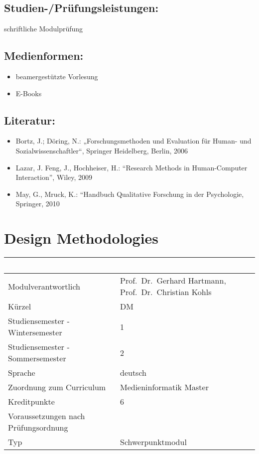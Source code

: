 \section*{Studien-/Prüfungsleistungen:}\label{studien-pruxfcfungsleistungen-9}

schriftliche Modulprüfung

\section*{Medienformen:}\label{medienformen-9}

\begin{itemize}
\item
  beamergestützte Vorlesung
\item
  E-Books
\end{itemize}

\section*{Literatur:}\label{literatur-9}

\begin{itemize}
\item
  Bortz, J.; Döring, N.: „Forschungsmethoden und Evaluation für Human-
  und Sozialwissenschaftler``, Springer Heidelberg, Berlin, 2006
\item
  Lazar, J. Feng, J., Hochheiser, H.: ``Research Methods in
  Human-Computer Interaction'', Wiley, 2009
\item
  May, G., Mruck, K.: ``Handbuch Qualitative Forschung in der
  Psychologie, Springer, 2010
\end{itemize}

\chapter{Design Methodologies}\label{design-methodologies}

\begin{longtable}[]{@{}ll@{}}
\toprule
~ & ~\tabularnewline
\midrule
\endhead
Modulverantwortlich & Prof.~Dr.~Gerhard Hartmann, Prof.~Dr.~Christian
Kohls\tabularnewline
Kürzel & DM\tabularnewline
Studiensemester - Wintersemester & 1\tabularnewline
Studiensemester - Sommersemester & 2\tabularnewline
Sprache & deutsch\tabularnewline
Zuordnung zum Curriculum & Medieninformatik Master\tabularnewline
Kreditpunkte & 6\tabularnewline
Voraussetzungen nach Prüfungsordnung &\tabularnewline
Typ & Schwerpunktmodul\tabularnewline
\bottomrule
\end{longtable}

